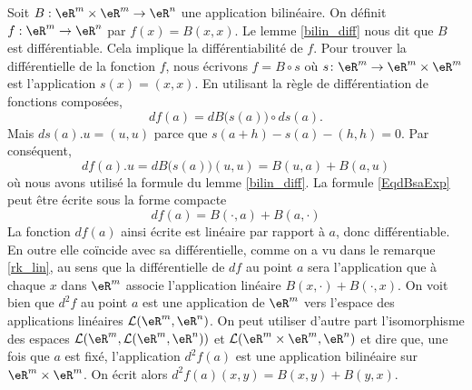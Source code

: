 \begin{example}\label{bilin_2diff}
	Soit $B:\eR^m\times \eR^m\to\eR^n$ une application bilinéaire. On définit $f:\eR^m\to\eR^n$ par $f(x)=B(x,x)$. Le lemme \ref{bilin_diff} nous dit que $B$ est différentiable. Cela implique la différentiabilité de $f$. Pour trouver la différentielle de la fonction $f$, nous écrivons $f=B\circ s$ où $s\colon \eR^m\to \eR^m\times\eR^m$ est l'application $s(x)=(x,x)$. En utilisant la règle de différentiation de fonctions composées,
	\begin{equation}
		df(a)=dB\big( s(a) \big)\circ ds(a).
	\end{equation}
	Mais $ds(a).u=(u,u)$ parce que $s(a+h)-s(a)-(h,h)=0$. Par conséquent,
	\begin{equation}		\label{EqdBsaExp}
		df(a).u=dB\big( s(a) \big)(u,u)=B(u,a)+B(a,u)
	\end{equation}
	où nous avons utilisé la formule du lemme \ref{bilin_diff}. La formule \eqref{EqdBsaExp} peut être écrite sous la forme compacte
	\begin{equation}
		df(a)=B(\cdot,a)+B(a,\cdot)
	\end{equation}
	La fonction $df(a)$ ainsi écrite est linéaire par rapport à $a$, donc différentiable. En outre elle coïncide avec sa différentielle, comme on a vu dans le remarque \ref{rk_lin}, au sens que la différentielle de $df$ au point $a$ sera l'application que à chaque $x$ dans $\eR^m$ associe l'application linéaire $B(x,\cdot)+B(\cdot, x)$. On voit bien que $d^2f$ au point $a$ est une application de $\eR^m$ vers l'espace des applications linéaires $\mathcal{L}(\eR^m, \eR^n)$. On peut utiliser d'autre part l'isomorphisme des espaces $\mathcal{L}(\eR^m,\mathcal{L}(\eR^m, \eR^n) )$ et $\mathcal{L}(\eR^m\times\eR^m, \eR^n )$ et dire que, une fois que $a$ est fixé, l'application $d^2f(a)$ est une application bilinéaire sur $\eR^m\times\eR^m$. On écrit alors $d^2f(a)(x,y)=B(x,y)+B(y,x)$.   
\end{example}

